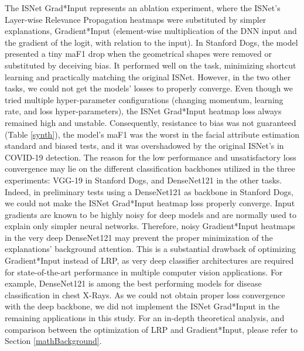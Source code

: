 \documentclass[fleqn,10pt]{wlscirep}
\begin{document}
{The ISNet Grad*Input represents an ablation experiment, where the ISNet's Layer-wise Relevance Propagation heatmaps were substituted by simpler explanations, Gradient*Input\cite{GradInput} (element-wise multiplication of the DNN input and the gradient of the logit, with relation to the input). In Stanford Dogs, the model presented a tiny maF1 drop when the geometrical shapes were removed or substituted by deceiving bias. It performed well on the task, minimizing shortcut learning and practically matching the original ISNet. However, in the two other tasks, we could not get the models' losses to properly converge. Even though we tried multiple hyper-parameter configurations (changing momentum, learning rate, and loss hyper-parameters), the ISNet Grad*Input heatmap loss always remained high and unstable. Consequently, resistance to bias was not guaranteed (Table \ref{synth}), the model's maF1 was the worst in the facial attribute estimation standard and biased tests, and it was overshadowed by the original ISNet's in COVID-19 detection. The reason for the low performance and unsatisfactory loss convergence may lie on the different classification backbones utilized in the three experiments: VGG-19 in Stanford Dogs, and DenseNet121 in the other tasks. Indeed, in preliminary tests using a DenseNet121 as backbone in Stanford Dogs, we could not make the ISNet Grad*Input heatmap loss properly converge. Input gradients are known to be highly noisy for deep models and are normally used to explain only simpler neural networks\cite{LRPvsGrad}. Therefore, noisy Gradient*Input heatmaps in the very deep DenseNet121 may prevent the proper minimization of the explanations' background attention. This is a substantial drawback of optimizing Gradient*Input instead of LRP, as very deep classifier architectures are required for state-of-the-art performance in multiple computer vision applications. For example, DenseNet121 is among the best performing models for disease classification in chest X-Rays\cite{chexnet}. As we could not obtain proper loss convergence with the deep backbone, we did not implement the ISNet Grad*Input in the remaining applications in this study. For an in-depth theoretical analysis, and comparison between the optimization of LRP and Gradient*Input, please refer to Section \ref{mathBackground}.

}
\end{document}
